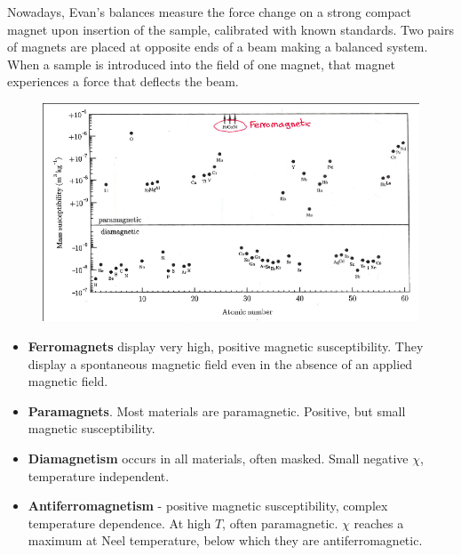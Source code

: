 \documentclass[a4paper, 11pt, normalem]{report}
\begin{document}
Nowadays, Evan's balances measure the force change on a strong compact magnet upon insertion of the sample, calibrated with known standards.
Two pairs of magnets are placed at opposite ends of a beam making a balanced system. 
When a sample is introduced into the field of one magnet, that magnet experiences a force that deflects the beam.
\begin{figure}[H]
    \centering
    \includegraphics[scale=0.5]{mags.png}
\end{figure}

\begin{itemize}
    \item \textbf{Ferromagnets} display very high, positive magnetic susceptibility. 
        They display a spontaneous magnetic field even in the absence of an applied magnetic field. 
    \item \textbf{Paramagnets}. Most materials are paramagnetic.
        Positive, but small magnetic susceptibility. 
    \item \textbf{Diamagnetism} occurs in all materials, often masked. 
        Small negative $\chi$, temperature independent.
    \item \textbf{Antiferromagnetism} - positive magnetic susceptibility, complex temperature dependence.
        At high $T$, often paramagnetic.
        $\chi$ reaches a maximum at Neel temperature, below which they are antiferromagnetic.
\end{itemize}
\end{document}
